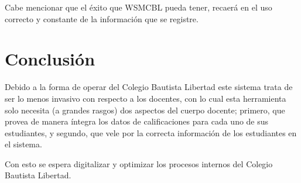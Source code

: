 \documentclass[12pt]{article}
\begin{document}
    Cabe mencionar que el éxito que WSMCBL pueda tener, recaerá en el uso correcto y constante de la información que se registre.

    \section{Conclusión}

    Debido a la forma de operar del Colegio Bautista Libertad este sistema trata de ser lo menos invasivo con respecto
    a los docentes, con lo cual esta herramienta solo necesita (a grandes rasgos) dos aspectos del cuerpo docente;
    primero, que provea de manera íntegra los datos de calificaciones para cada uno de sus estudiantes, y segundo, que
    vele por la correcta información de los estudiantes en el sistema.

    Con esto se espera digitalizar y optimizar los procesos internos del Colegio Bautista Libertad.
\end{document}
